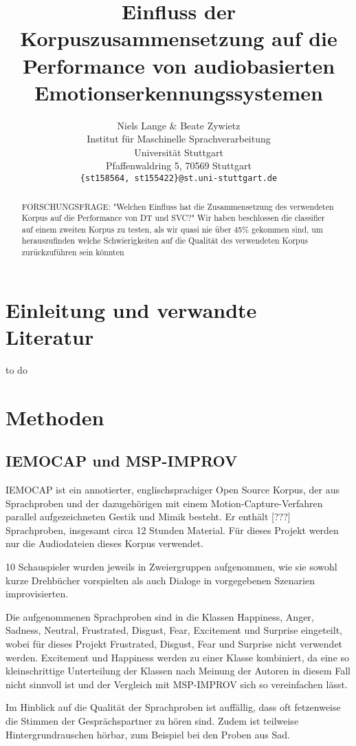 \documentclass{article} %
\title{Einfluss der Korpuszusammensetzung auf die Performance von audiobasierten Emotionserkennungssystemen}
\author{Niels Lange \& Beate Zywietz\\
Institut für Maschinelle Sprachverarbeitung\\
Universität Stuttgart\\
Pfaffenwaldring 5, 70569 Stuttgart \\
\texttt{\{st158564, st155422\}@st.uni-stuttgart.de} \\
}
\begin{document}
\maketitle
\begin{abstract}

FORSCHUNGSFRAGE: "Welchen Einfluss hat die Zusammensetzung des verwendeten Korpus auf die Performance von DT und SVC?"
Wir haben beschlossen die classifier auf einem zweiten Korpus zu testen, als wir quasi nie über 45\% gekommen sind, um herauszufinden welche Schwierigkeiten auf die Qualität des verwendeten Korpus zurückzuführen sein könnten
\end{abstract}

\section{Einleitung und verwandte Literatur}

to do

\section{Methoden}

\subsection{IEMOCAP und MSP-IMPROV}

IEMOCAP ist ein annotierter, englischsprachiger Open Source Korpus, der aus Sprachproben und der dazugehörigen mit einem Motion-Capture-Verfahren parallel aufgezeichneten Gestik und Mimik besteht. Er enthält [???] Sprachproben, insgesamt circa 12 Stunden Material. Für dieses Projekt werden nur die Audiodateien dieses Korpus verwendet. 

10 Schauspieler wurden jeweils in Zweiergruppen aufgenommen, wie sie sowohl kurze Drehbücher vorspielten als auch Dialoge in vorgegebenen Szenarien improvisierten. 

Die aufgenommenen Sprachproben sind in die Klassen Happiness, Anger, Sadness, Neutral, Frustrated, Disgust, Fear, Excitement und Surprise eingeteilt, wobei für dieses Projekt Frustrated, Disgust, Fear und Surprise nicht verwendet werden. Excitement und Happiness werden zu einer Klasse kombiniert, da eine so kleinschrittige Unterteilung der Klassen nach Meinung der Autoren in diesem Fall nicht sinnvoll ist und der Vergleich mit MSP-IMPROV sich so vereinfachen lässt. 

Im Hinblick auf die Qualität der Sprachproben ist auffällig, dass oft fetzenweise die Stimmen der Gesprächspartner zu hören sind. Zudem ist teilweise Hintergrundrauschen hörbar, zum Beispiel bei den Proben aus Sad. 
\end{document}
